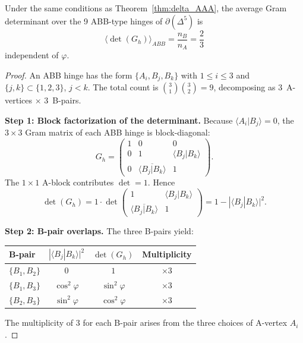\begin{theorem}\label{thm:det_ABB}
Under the same conditions as Theorem~\ref{thm:delta_AAA},
the average Gram determinant over the 9 ABB-type hinges of
$\partial(\Delta^5)$ is
\begin{equation}
\boxed{\bigl\langle \det(G_h) \bigr\rangle_{ABB} = \frac{n_B}{n_A}
= \frac{2}{3}}
\end{equation}
independent of $\varphi$.
\end{theorem}

\begin{proof}
An ABB hinge has the form $\{A_i, B_j, B_k\}$ with $1 \leq i \leq 3$
and $\{j,k\} \subset \{1,2,3\}$, $j < k$.  The total count is
$\binom{3}{1}\binom{3}{2} = 9$, decomposing as $3$~A-vertices
$\times$ $3$~B-pairs.

\medskip\noindent\textbf{Step 1: Block factorization of the determinant.}
Because $\langle A_i | B_j \rangle = 0$, the $3 \times 3$ Gram matrix
of each ABB hinge is block-diagonal:
\begin{equation}
G_h = \begin{pmatrix} 1 & 0 & 0 \\ 0 & 1 & \langle B_j | B_k\rangle \\
0 & \overline{\langle B_j | B_k\rangle} & 1 \end{pmatrix}.
\end{equation}
The $1\times 1$ A-block contributes $\det = 1$.  Hence
\begin{equation}\label{eq:det_ABB_factor}
\det(G_h) = 1 \cdot \det\!\begin{pmatrix} 1 & \langle B_j|B_k\rangle \\
\overline{\langle B_j|B_k\rangle} & 1 \end{pmatrix}
= 1 - |\langle B_j | B_k \rangle|^2.
\end{equation}

\medskip\noindent\textbf{Step 2: B-pair overlaps.}
The three B-pairs yield:
\begin{center}
\begin{tabular}{lccc}
\toprule
B-pair & $|\langle B_j | B_k \rangle|^2$ & $\det(G_h)$ & Multiplicity \\
\midrule
$\{B_1, B_2\}$ & $0$ & $1$ & $\times 3$ \\
$\{B_1, B_3\}$ & $\cos^2\varphi$ & $\sin^2\varphi$ & $\times 3$ \\
$\{B_2, B_3\}$ & $\sin^2\varphi$ & $\cos^2\varphi$ & $\times 3$ \\
\bottomrule
\end{tabular}
\end{center}
The multiplicity of 3 for each B-pair arises from the three choices
of A-vertex $A_i$.


\end{proof}
